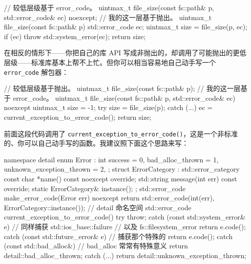 \begin{codebox}[cpp]
     // 较低层级基于 error_code。
     uintmax_t file_size(const fs::path& p,
         std::error_code& ec) noexcept;
     // 我的这一层基于抛出。
     uintmax_t file_size(const fs::path& p)
     {
       std::error_code ec;
       uintmax_t size = file_size(p, ec);
       if (ec) {
         throw std::system_error(ec);
       }
       return size;
     }
\end{codebox}

在相反的情形下——你把自己的库 API 写成非抛出的，却调用了可能抛出的更低层级——标准库基本上帮不上忙。但你可以相当容易地自己动手写一个 \texttt{error\_\allowbreak{}code} 解包器：

\begin{codebox}[cpp]
     // 较低层级基于抛出。
     uintmax_t file_size(const fs::path& p);
     // 我的这一层基于 error_code。
     uintmax_t file_size(const fs::path& p,
         std::error_code& ec) noexcept
     {
       uintmax_t size = -1;
       try {
         size = file_size(p);
       } catch (...) {
         ec = current_exception_to_error_code();
       }
       return size;
     }
\end{codebox}

前面这段代码调用了 \texttt{current\_\allowbreak{}exception\_\allowbreak{}to\_\allowbreak{}error\_\allowbreak{}code(\allowbreak{})\allowbreak{}}，这是一个非标准的、你可以自己动手写的函数。我建议照下面这个思路来写：

\begin{codebox}[cpp]
  namespace detail {
  enum Error : int {
     success = 0,
     bad_alloc_thrown = 1,
     unknown_exception_thrown = 2,
  };
  struct ErrorCategory : std::error_category {
     const char *name() const noexcept override;
     std::string message(int err) const override;
     static ErrorCategory& instance();
  };
  std::error_code make_error_code(Error err) noexcept {
     return std::error_code(int(err), ErrorCategory::instance());
  }
  } // detail 命名空间
  std::error_code current_exception_to_error_code()
  {
     try {
         throw;
     } catch (const std::system_error& e) {
         // 同样捕获 std::ios_base::failure
         // 以及 fs::filesystem_error
         return e.code();
     } catch (const std::future_error& e) {
         // 捕获那个特殊的
         return e.code();
     } catch (const std::bad_alloc&) {
         // bad_alloc 常常有特殊意义
         return detail::bad_alloc_thrown;
     } catch (...) {
         return detail::unknown_exception_thrown;
     }
  }
\end{codebox}

